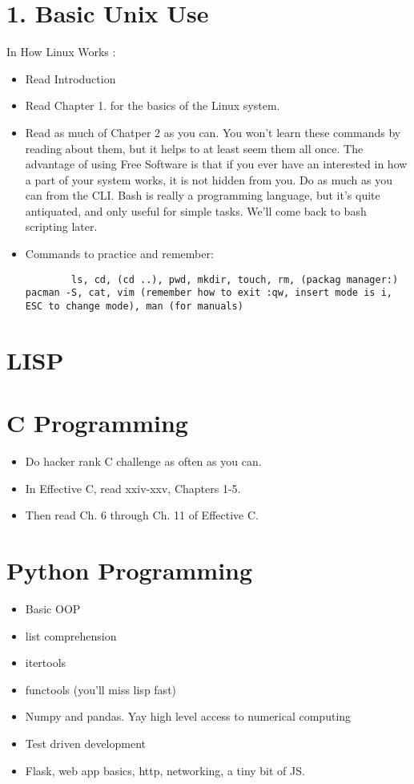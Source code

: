 \documentclass[a4paper, 12pt]{report}
\begin{document}
    \romantableofcontents

\chapter{1. Basic Unix Use}
    In How Linux Works \cite{howlinux}:
        \begin{itemize}
                \item Read Introduction
                \item Read Chapter 1. for the basics of the Linux system.
                \item Read as much of Chatper 2 as you can. You won't learn these commands by reading about them, but it helps to at least seem them all once. The advantage of using Free Software is that if you ever have an interested in how a part of your system works, it is not hidden from you. Do as much as you can from the CLI. Bash is really a programming language, but it's quite antiquated, and only useful for simple tasks. We'll come back to bash scripting later.

                \item Commands to practice and remember:
                
                \begin{lstlisting} 
        ls, cd, (cd ..), pwd, mkdir, touch, rm, (packag manager:) pacman -S, cat, vim (remember how to exit :qw, insert mode is i, ESC to change mode), man (for manuals)\end{lstlisting}
        \end{itemize}
\chapter{LISP}
\chapter{C Programming}
\begin{itemize}
        \item Do hacker rank C challenge as often as you can.
        \item In Effective C, read xxiv-xxv, Chapters 1-5.
        \item Then read Ch. 6 through Ch. 11 of Effective C. 
\end{itemize}
\chapter{Python Programming}
\begin{itemize}
        \item Basic OOP
        \item list comprehension
        \item itertools
	\item functools (you'll miss lisp fast)
        \item Numpy and pandas. Yay high level access to numerical computing
        \item Test driven development
        \item Flask, web app basics, http, networking, a tiny bit of JS.
        \end{itemize}
\end{document}

